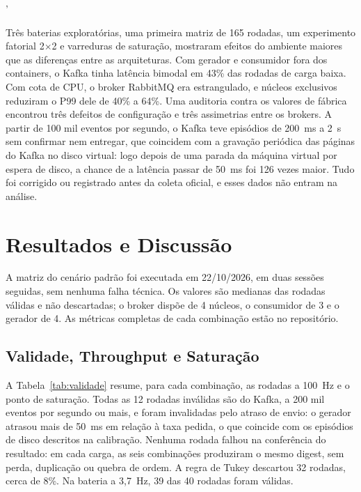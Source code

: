 '\documentclass[12pt]{article}
\begin{document}
Três baterias exploratórias, uma primeira matriz de 165 rodadas, um experimento fatorial
2$\times$2 e varreduras de saturação, mostraram efeitos do ambiente maiores que as
diferenças entre as arquiteturas. Com gerador e consumidor fora dos containers, o Kafka
tinha latência bimodal em 43\% das rodadas de carga baixa. Com cota de CPU, o broker
RabbitMQ era estrangulado, e núcleos exclusivos reduziram o P99 dele de 40\% a 64\%. Uma
auditoria contra os valores de fábrica encontrou três defeitos de configuração e três
assimetrias entre os brokers. A partir de 100 mil eventos por segundo, o Kafka teve
episódios de 200~ms a 2~s sem confirmar nem entregar, que coincidem com a gravação
periódica das páginas do Kafka no disco virtual: logo depois de uma parada da máquina
virtual por espera de disco, a chance de a latência passar de 50~ms foi 126 vezes maior.
Tudo foi corrigido ou registrado antes da coleta oficial, e esses dados não entram na
análise.


\section{Resultados e Discussão}
\label{sec:resultados}

A matriz do cenário padrão foi executada em 22/10/2026, em duas sessões seguidas, sem
nenhuma falha técnica. Os valores são medianas das rodadas válidas e não descartadas; o
broker dispõe de 4 núcleos, o consumidor de 3 e o gerador de 4. As métricas completas de
cada combinação estão no repositório.

\subsection{Validade, Throughput e Saturação}

A Tabela~\ref{tab:validade} resume, para cada combinação, as rodadas a 100~Hz e o ponto
de saturação. Todas as 12 rodadas inválidas são do Kafka, a 200 mil eventos por segundo
ou mais, e foram invalidadas pelo atraso de envio: o gerador atrasou mais de 50~ms em
relação à taxa pedida, o que coincide com os episódios de disco descritos na calibração.
Nenhuma
rodada falhou na conferência do resultado: em cada carga, as seis combinações produziram
o mesmo digest, sem perda, duplicação ou quebra de ordem. A regra de Tukey descartou 32
rodadas, cerca de 8\%. Na bateria a 3,7~Hz, 39 das 40 rodadas foram válidas.
\end{document}
